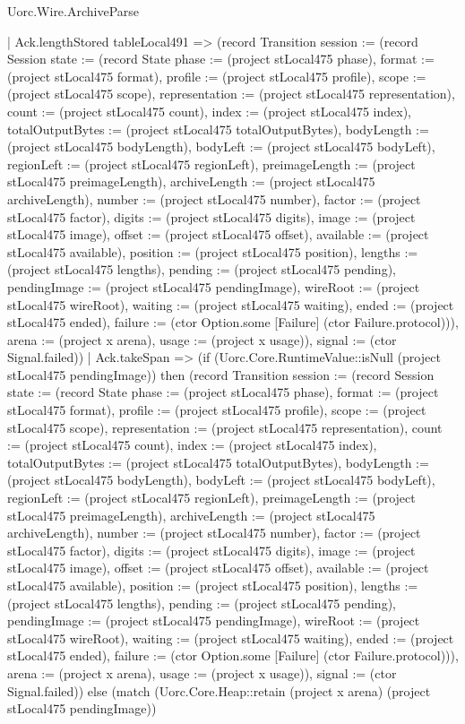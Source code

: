 \begin{lexlean}{Uorc.Wire.ArchiveParse}
\begin{semanticmodule}
{          | Ack.lengthStored tableLocal491 => (record Transition {session := (record Session {state := (record State {phase := (project stLocal475 phase), format := (project stLocal475 format), profile := (project stLocal475 profile), scope := (project stLocal475 scope), representation := (project stLocal475 representation), count := (project stLocal475 count), index := (project stLocal475 index), totalOutputBytes := (project stLocal475 totalOutputBytes), bodyLength := (project stLocal475 bodyLength), bodyLeft := (project stLocal475 bodyLeft), regionLeft := (project stLocal475 regionLeft), preimageLength := (project stLocal475 preimageLength), archiveLength := (project stLocal475 archiveLength), number := (project stLocal475 number), factor := (project stLocal475 factor), digits := (project stLocal475 digits), image := (project stLocal475 image), offset := (project stLocal475 offset), available := (project stLocal475 available), position := (project stLocal475 position), lengths := (project stLocal475 lengths), pending := (project stLocal475 pending), pendingImage := (project stLocal475 pendingImage), wireRoot := (project stLocal475 wireRoot), waiting := (project stLocal475 waiting), ended := (project stLocal475 ended), failure := (ctor Option.some [Failure] (ctor Failure.protocol))}), arena := (project x arena), usage := (project x usage)}), signal := (ctor Signal.failed)})
          | Ack.takeSpan => (if (Uorc.Core.RuntimeValue::isNull (project stLocal475 pendingImage)) then (record Transition {session := (record Session {state := (record State {phase := (project stLocal475 phase), format := (project stLocal475 format), profile := (project stLocal475 profile), scope := (project stLocal475 scope), representation := (project stLocal475 representation), count := (project stLocal475 count), index := (project stLocal475 index), totalOutputBytes := (project stLocal475 totalOutputBytes), bodyLength := (project stLocal475 bodyLength), bodyLeft := (project stLocal475 bodyLeft), regionLeft := (project stLocal475 regionLeft), preimageLength := (project stLocal475 preimageLength), archiveLength := (project stLocal475 archiveLength), number := (project stLocal475 number), factor := (project stLocal475 factor), digits := (project stLocal475 digits), image := (project stLocal475 image), offset := (project stLocal475 offset), available := (project stLocal475 available), position := (project stLocal475 position), lengths := (project stLocal475 lengths), pending := (project stLocal475 pending), pendingImage := (project stLocal475 pendingImage), wireRoot := (project stLocal475 wireRoot), waiting := (project stLocal475 waiting), ended := (project stLocal475 ended), failure := (ctor Option.some [Failure] (ctor Failure.protocol))}), arena := (project x arena), usage := (project x usage)}), signal := (ctor Signal.failed)}) else (match (Uorc.Core.Heap::retain (project x arena) (project stLocal475 pendingImage))
}
\end{semanticmodule}
\end{lexlean}
